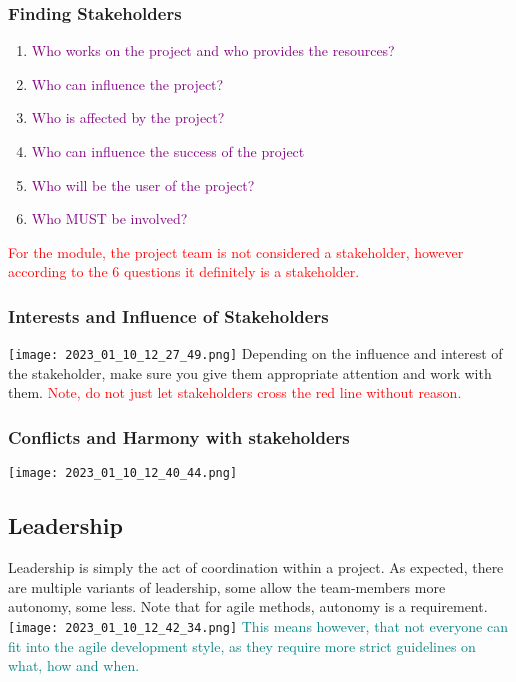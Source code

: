 \documentclass[main.tex,fontsize=12pt,paper=a4,paper=landscape,DIV=calc,]{scrartcl}
\begin{document}
\begin{multicols*}{2}
\subsubsection{Finding Stakeholders}
\begin{enumerate}
\item \textcolor{purple}{Who works on the project and who provides the resources?}
\item \textcolor{purple}{Who can influence the project?}
\item \textcolor{purple}{Who is affected by the project?}
\item \textcolor{purple}{Who can influence the success of the project}
\item \textcolor{purple}{Who will be the user of the project?}
\item \textcolor{purple}{Who MUST be involved?}
\end{enumerate}
\textcolor{red}{For the module, the project team is not considered a stakeholder, however according to the 6 questions it definitely is a stakeholder.}

\subsubsection{Interests and Influence of Stakeholders}
\texttt{[image: 2023\_01\_10\_12\_27\_49.png]}\newline
Depending on the influence and interest of the stakeholder, make sure you give them appropriate attention and work with them.\newline
\textcolor{red}{Note, do not just let stakeholders cross the red line without reason.}

\subsubsection{Conflicts and Harmony with stakeholders}
\texttt{[image: 2023\_01\_10\_12\_40\_44.png]}

\subsection{Leadership}
Leadership is simply the act of coordination within a project.\newline
As expected, there are multiple variants of leadership, some allow the team-members more autonomy, some less.\newline
Note that for agile methods, autonomy is a requirement.\newline
\texttt{[image: 2023\_01\_10\_12\_42\_34.png]}\newline
\textcolor{teal}{This means however, that not everyone can fit into the agile development style, as they require more strict guidelines on what, how and when.} 


\end{multicols*}
\end{document}
